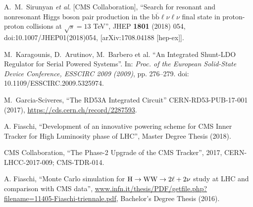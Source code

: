 \documentclass[a4paper,11pt,english]{article}
\begin{document}
\vspace{-.3cm}
%
%
\begin{small}
\begin{thebibliography}{1}
  A.~M.~Sirunyan {\it et al.} [CMS Collaboration], ``Search for resonant and nonresonant Higgs boson pair production in the $ \mathrm{b}\overline{\mathrm{b}}\mathit{\ell \nu \ell \nu } $ final state in proton-proton collisions at $ \sqrt{s}=13 $ TeV'',  JHEP {\bf 1801} (2018) 054,  doi:10.1007/JHEP01(2018)054, [arXiv:1708.04188 [hep-ex]].

 M.~Karagounis, D.~Arutinov, M.~Barbero et al. ``An Integrated Shunt-LDO Regulator for Serial Powered Systems''. In: \textit{Proc. of the European Solid-State Device Conference,
ESSCIRC 2009 (2009)}, pp. 276–279. doi: 10.1109/ESSCIRC.2009.5325974.

 M.~Garcia-Sciveres, ``The RD53A Integrated Circuit''
CERN-RD53-PUB-17-001 (2017), \url{https://cds.cern.ch/record/2287593}.

 A. Fiaschi, ``Development of an innovative powering scheme for CMS Inner Tracker for High Luminosity phase of LHC'', Master Degree Thesis (2018).

 CMS Collaboration, ``The Phase-2 Upgrade of the CMS
  Tracker'', 2017, CERN-LHCC-2017-009; CMS-TDR-014.

 A. Fiaschi, ``Monte Carlo simulation for ${\mathrm H} \rightarrow \mathrm{{\mathrm W} {\mathrm W}}\rightarrow 2\ell + 2\nu$ study at LHC and comparison with CMS data'', \url{www.infn.it/thesis/PDF/getfile.php?filename=11405-Fiaschi-triennale.pdf}, Bachelor’s Degree Thesis (2016).

\end{thebibliography}
\end{small}
\end{document}
